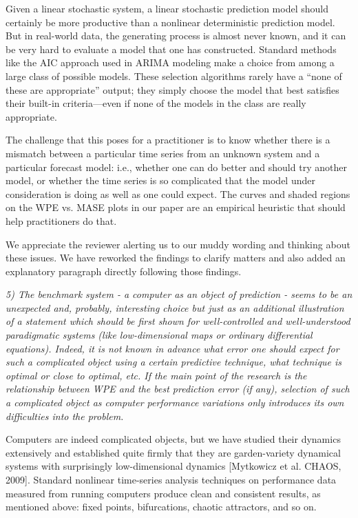 \documentclass[12pt]{article}
\begin{document}
Given a linear stochastic system, a linear stochastic prediction model
should certainly be more productive than a nonlinear deterministic
prediction model.  But in real-world data, the generating process is
almost never known, and it can be very hard to evaluate a model that
one has constructed.  Standard methods like the AIC approach used in
ARIMA modeling make a choice from among a large class of possible
models.  These selection algorithms rarely have a ``none of these are
appropriate'' output; they simply choose the model that best satisfies
their built-in criteria---even if none of the models in the class are
really appropriate.

The challenge that this poses for a practitioner is to know whether
there is a mismatch between a particular time series from an unknown
system and a particular forecast model: i.e., whether one can do
better and should try another model, or whether the time series is so
complicated that the model under consideration is doing as well as one
could expect.  The curves and shaded regions on the WPE vs. MASE plots
in our paper are an empirical heuristic that should help practitioners
do that.

We appreciate the reviewer alerting us to our muddy wording and
thinking about these issues.  We have reworked the findings to clarify
matters and also added an explanatory paragraph directly following
those findings.

\smallskip

\emph{5) The benchmark system - a computer as an object of prediction
  - seems to be an unexpected and, probably, interesting choice but
  just as an additional illustration of a statement which should be
  first shown for well-controlled and well-understood paradigmatic
  systems (like low-dimensional maps or ordinary differential
  equations). Indeed, it is not known in advance what error one should
  expect for such a complicated object using a certain predictive
  technique, what technique is optimal or close to optimal, etc. If
  the main point of the research is the relationship between WPE and
  the best prediction error (if any), selection of such a complicated
  object as computer performance variations only introduces its own
  difficulties into the problem.}

Computers are indeed complicated objects, but we have studied their
dynamics extensively and established quite firmly that they are
garden-variety dynamical systems with surprisingly low-dimensional
dynamics [Mytkowicz et al. CHAOS, 2009].  Standard nonlinear
time-series analysis techniques on performance data measured from
running computers produce clean and consistent results, as mentioned
above: fixed points, bifurcations, chaotic attractors, and so on.
\end{document}
